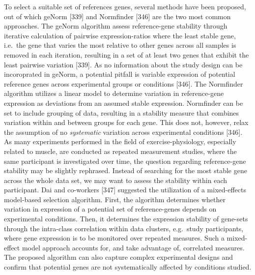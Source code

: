 \documentclass[twoside,10pt]{gihclass} %
\begin{document}
To select a suitable set of references genes, several methods have been proposed, out of which geNorm {[}339{]} and Normfinder {[}346{]} are the two most common approaches.
The geNorm algorithm assess reference-gene stability through iterative calculation of pairwise expression-ratios where the least stable gene, i.e.~the gene that varies the most relative to other genes across all samples is removed in each iteration, resulting in a set of at least two genes that exhibit the least pairwise variation {[}339{]}.
As no information about the study design can be incoroprated in geNorm, a potential pitfall is variable expression of potential reference genes across experimental groups or conditions {[}346{]}.
The Normfinder algorithm utilizes a linear model to determine variation in reference-gene expression as deviations from an assumed stable expression.
Normfinder can be set to include grouping of data, resulting in a stability measure that combines variation within and between groups for each gene.
This does not, however, relax the assumption of no \emph{systematic} variation across experimental conditions {[}346{]}.
As many experiments performed in the field of exercise-physiology, especially related to muscle, are conducted as repeated measurement studies, where the same participant is investigated over time, the question regarding reference-gene stability may be slightly rephrased. Instead of searching for the most stable gene across the whole data set, we may want to assess the stability within each participant.
Dai and co-workers {[}347{]} suggested the utilization of a mixed-effects model-based selection algorithm.
First, the algorithm determines whether variation in expression of a potential set of reference-genes depends on experimental conditions.
Then, it determines the expression stability of gene-sets through the intra-class correlation within data clusters, e.g.~study participants, where gene expression is to be monitored over repeated measures.
Such a mixed-effect model approach accounts for, and take advantage of, correlated measures.
The proposed algorithm can also capture complex experimental designs and confirm that potential genes are not systematically affected by conditions studied.
\end{document}
